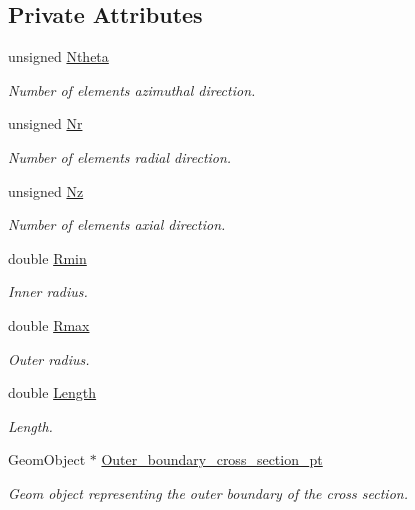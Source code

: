 \subsection*{Private Attributes}
\begin{DoxyCompactItemize}
\item 
unsigned \hyperlink{classoomph_1_1QuarterPipeDomain_aeb912b40da8cd2883768fe2ca989e640}{Ntheta}
\begin{DoxyCompactList}\small\item\em Number of elements azimuthal direction. \end{DoxyCompactList}\item 
unsigned \hyperlink{classoomph_1_1QuarterPipeDomain_a18ac22546af74ac9b76a870d3f5abe3d}{Nr}
\begin{DoxyCompactList}\small\item\em Number of elements radial direction. \end{DoxyCompactList}\item 
unsigned \hyperlink{classoomph_1_1QuarterPipeDomain_aab1bf3900c3537c44942e3fee0c3d24e}{Nz}
\begin{DoxyCompactList}\small\item\em Number of elements axial direction. \end{DoxyCompactList}\item 
double \hyperlink{classoomph_1_1QuarterPipeDomain_ac71370e6c78fd37aa59e7a52d62d1cbe}{Rmin}
\begin{DoxyCompactList}\small\item\em Inner radius. \end{DoxyCompactList}\item 
double \hyperlink{classoomph_1_1QuarterPipeDomain_a5e2252883456cd65902663fda09296d5}{Rmax}
\begin{DoxyCompactList}\small\item\em Outer radius. \end{DoxyCompactList}\item 
double \hyperlink{classoomph_1_1QuarterPipeDomain_a0798f3962e840bdb3d31e4e0dada055d}{Length}
\begin{DoxyCompactList}\small\item\em Length. \end{DoxyCompactList}\item 
Geom\+Object $\ast$ \hyperlink{classoomph_1_1QuarterPipeDomain_adad2a4e638bb58eda89a19eaf5e18969}{Outer\+\_\+boundary\+\_\+cross\+\_\+section\+\_\+pt}
\begin{DoxyCompactList}\small\item\em Geom object representing the outer boundary of the cross section. \end{DoxyCompactList}\item 

\end{DoxyCompactItemize}

